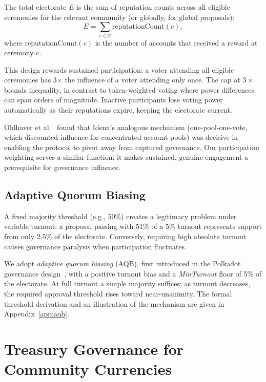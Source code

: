 \documentclass{svproc}
\begin{document}
The total electorate $E$ is the sum of reputation counts across all eligible ceremonies for the relevant community (or globally, for global proposals):
\begin{equation}
E = \sum_{c \in \mathcal{C}} \text{reputationCount}(c),
\end{equation}
where $\text{reputationCount}(c)$ is the number of accounts that received a reward at ceremony $c$.

This design rewards sustained participation: a voter attending all eligible ceremonies has 3$\times$ the influence of a voter attending only once. The cap at $3\times$ bounds inequality, in contrast to token-weighted voting where power differences can span orders of magnitude. Inactive participants lose voting power automatically as their reputations expire, keeping the electorate current.

Ohlhaver et al.~\cite{ohlhaver2024proof} found that Idena's analogous mechanism (one-pool-one-vote, which discounted influence for concentrated account pools) was decisive in enabling the protocol to pivot away from captured governance. Our participation weighting serves a similar function: it makes sustained, genuine engagement a prerequisite for governance influence.


\subsection{Adaptive Quorum Biasing}
\label{sec:quorum}

A fixed majority threshold (e.g., 50\%) creates a legitimacy problem under variable turnout: a proposal passing with 51\% of a 5\% turnout represents support from only 2.5\% of the electorate. Conversely, requiring high absolute turnout causes governance paralysis when participation fluctuates.

We adopt \emph{adaptive quorum biasing} (AQB), first introduced in the Polkadot governance design~\cite{burdges2020overview}, with a positive turnout bias and a \emph{MinTurnout} floor of 5\% of the electorate. At full turnout a simple majority suffices; as turnout decreases, the required approval threshold rises toward near-unanimity. The formal threshold derivation and an illustration of the mechanism are given in Appendix~\ref{app:aqb}.

\section{Treasury Governance for Community Currencies}
\label{sec:treasury}
\end{document}
